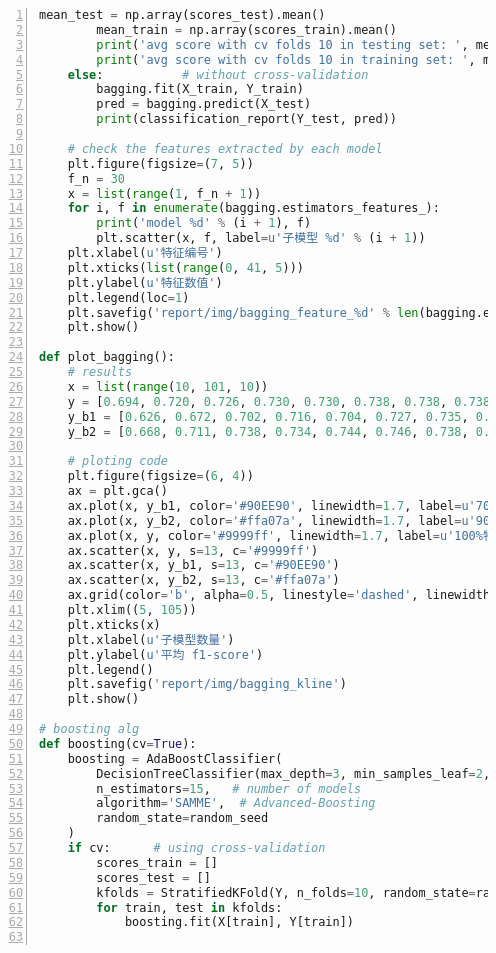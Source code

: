\documentclass[12pt,a4paper]{article}
\theoremstyle{definition}
\begin{document}
\begin{appendix}
\begin{lstlisting}[language=Python,
	numbers=left,
	keywordstyle=\color{blue!70},
	frame=shadowbox,
	breaklines=True]
        mean_test = np.array(scores_test).mean()
        mean_train = np.array(scores_train).mean()
        print('avg score with cv folds 10 in testing set: ', mean_test)
        print('avg score with cv folds 10 in training set: ', mean_train)
    else:           # without cross-validation
        bagging.fit(X_train, Y_train)
        pred = bagging.predict(X_test)
        print(classification_report(Y_test, pred))

    # check the features extracted by each model
    plt.figure(figsize=(7, 5))
    f_n = 30
    x = list(range(1, f_n + 1))
    for i, f in enumerate(bagging.estimators_features_):
        print('model %d' % (i + 1), f)
        plt.scatter(x, f, label=u'子模型 %d' % (i + 1))
    plt.xlabel(u'特征编号')
    plt.xticks(list(range(0, 41, 5)))
    plt.ylabel(u'特征数值')
    plt.legend(loc=1)
    plt.savefig('report/img/bagging_feature_%d' % len(bagging.estimators_features_))
    plt.show()

def plot_bagging():
    # results
    x = list(range(10, 101, 10))
    y = [0.694, 0.720, 0.726, 0.730, 0.730, 0.738, 0.738, 0.738, 0.738, 0.744]
    y_b1 = [0.626, 0.672, 0.702, 0.716, 0.704, 0.727, 0.735, 0.732, 0.736, 0.738]
    y_b2 = [0.668, 0.711, 0.738, 0.734, 0.744, 0.746, 0.738, 0.730, 0.740, 0.738]

    # ploting code
    plt.figure(figsize=(6, 4))
    ax = plt.gca()
    ax.plot(x, y_b1, color='#90EE90', linewidth=1.7, label=u'70%特征')
    ax.plot(x, y_b2, color='#ffa07a', linewidth=1.7, label=u'90%特征')
    ax.plot(x, y, color='#9999ff', linewidth=1.7, label=u'100%特征')
    ax.scatter(x, y, s=13, c='#9999ff')
    ax.scatter(x, y_b1, s=13, c='#90EE90')
    ax.scatter(x, y_b2, s=13, c='#ffa07a')
    ax.grid(color='b', alpha=0.5, linestyle='dashed', linewidth=0.5)
    plt.xlim((5, 105))
    plt.xticks(x)
    plt.xlabel(u'子模型数量')
    plt.ylabel(u'平均 f1-score')
    plt.legend()
    plt.savefig('report/img/bagging_kline')
    plt.show()

# boosting alg
def boosting(cv=True):
    boosting = AdaBoostClassifier(
        DecisionTreeClassifier(max_depth=3, min_samples_leaf=2, random_state=random_seed),
        n_estimators=15,   # number of models
        algorithm='SAMME',  # Advanced-Boosting
        random_state=random_seed
    )
    if cv:      # using cross-validation
        scores_train = []
        scores_test = []
        kfolds = StratifiedKFold(Y, n_folds=10, random_state=random_seed)
        for train, test in kfolds:
            boosting.fit(X[train], Y[train])


\end{lstlisting}
\end{appendix}
\end{document}
